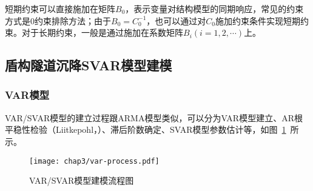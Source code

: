 短期约束可以直接施加在矩阵$B_0$，表示变量对结构模型的同期响应，常见的约束方式是0约束排除方法；由于$B_0=C_0^{-1}$，也可以通过对$C_0$施加约束条件实现短期约束。对于长期约束，一般是通过施加在系数矩阵$B_i(i=1,2,\cdots )$上。

\subsection{盾构隧道沉降SVAR模型建模}

\subsubsection{VAR模型}

VAR/SVAR模型的建立过程跟ARMA模型类似，可以分为VAR模型建立、AR根平稳性检验（Liitkepohl，\citeyear{liitkepohl1991introduction}）、滞后阶数确定、SVAR模型参数估计等，如图~\ref{fig:VARSVAR模型建模流程图}~所示。

\begin{figure}[htb!]
    \centering
    \texttt{[image: chap3/var-process.pdf]}
    \caption{VAR/SVAR模型建模流程图}
    \label{fig:VARSVAR模型建模流程图}
\end{figure}

